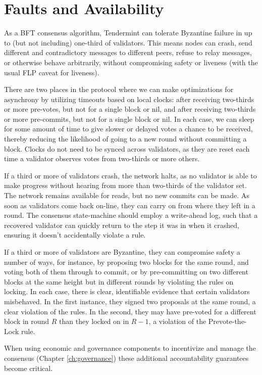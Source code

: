 \section{Faults and Availability}

As a BFT consensus algorithm, Tendermint can tolerate Byzantine failure in up to 
(but not including) one-third of validators.
This means nodes can crash, send different and contradictory messages to different peers, 
refuse to relay messages, or otherwise behave arbitrarily,
without compromising safety or liveness (with the usual FLP caveat for liveness).

There are two places in the protocol where we can make optimizations 
for asynchrony by utilizing timeouts based on local clocks:
after receiving two-thirds or more pre-votes, but not for a single block or nil, 
and after receiving two-thirds or more pre-commits, 
but not for a single block or nil.
In each case, we can sleep for some amount of time to give slower or delayed votes a chance to be received,
thereby reducing the likelihood of going to a new round without committing a block.
Clocks do not need to be synced across validators, 
as they are reset each time a validator observes votes from two-thirds or more others.

If a third or more of validators crash, the network halts, 
as no validator is able to make progress without hearing from more than two-thirds of the validator set.
The network remains available for reads, but no new commits can be made.
As soon as validators come back on-line, they can carry on from where they left in a round. 
The consensus state-machine should employ a write-ahead log,
such that a recovered validator can quickly return to the step it was in when it crashed,
ensuring it doesn't accidentally violate a rule.

If a third or more of validators are Byzantine, they can compromise safety a number of ways, 
for instance, by proposing two blocks for the same round, and voting both of them through to commit, 
or by pre-committing on two different blocks at the same height but in 
different rounds by violating the rules on locking.
In each case, there is clear, identifiable evidence that certain validators misbehaved. 
In the first instance, they signed two proposals at the same round, a clear violation of the rules.
In the second, they may have pre-voted for a different block in round $R$ than they locked on in $R-1$, 
a violation of the Prevote-the-Lock rule.

When using economic and governance components to incentivize 
and manage the consensus (Chapter  \ref{ch:governance})
these additional accountability guarantees become critical.

